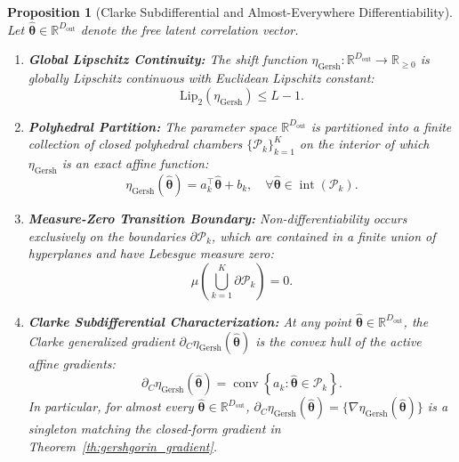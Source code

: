\documentclass[default,sn-mathphys,Numbered]{sn-jnl}
\theoremstyle{thmstyleone}
\newtheorem{proposition}[theorem]{Proposition}
\theoremstyle{thmstylethree}
\theoremstyle{thmstyletwo}
\newcommand{\outp}{\text{out}}
\begin{document}
\begin{appendices}
\begin{proposition}[Clarke Subdifferential and Almost-Everywhere Differentiability]
\label{prop:clarke_subdiff}
Let $\hat{\bm{\theta}} \in \mathbb{R}^{D_{\outp}}$ denote the free latent correlation vector.
\begin{enumerate}
    \item[(a)] \textbf{Global Lipschitz Continuity:} The shift function $\eta_{\mathrm{Gersh}} : \mathbb{R}^{D_{\outp}} \to \mathbb{R}_{\ge 0}$ is globally Lipschitz continuous with Euclidean Lipschitz constant:
    \begin{equation}
    \label{eq:lipschitz_bound}
    \mathrm{Lip}_2(\eta_{\mathrm{Gersh}}) \le L - 1.
    \end{equation}
    \item[(b)] \textbf{Polyhedral Partition:} The parameter space $\mathbb{R}^{D_{\outp}}$ is partitioned into a finite collection of closed polyhedral chambers $\{\mathcal{P}_k\}_{k=1}^K$ on the interior of which $\eta_{\mathrm{Gersh}}$ is an exact affine function:
    \begin{equation}
    \eta_{\mathrm{Gersh}}(\hat{\bm{\theta}}) = a_k^\top \hat{\bm{\theta}} + b_k, \quad \forall \hat{\bm{\theta}} \in \operatorname{int}(\mathcal{P}_k).
    \end{equation}
    \item[(c)] \textbf{Measure-Zero Transition Boundary:} Non-differentiability occurs exclusively on the boundaries $\partial \mathcal{P}_k$, which are contained in a finite union of hyperplanes and have Lebesgue measure zero:
    \begin{equation}
    \mu\left( \bigcup_{k=1}^K \partial \mathcal{P}_k \right) = 0.
    \end{equation}
    \item[(d)] \textbf{Clarke Subdifferential Characterization:} At any point $\hat{\bm{\theta}} \in \mathbb{R}^{D_{\outp}}$, the Clarke generalized gradient $\partial_C \eta_{\mathrm{Gersh}}(\hat{\bm{\theta}})$ is the convex hull of the active affine gradients:
    \begin{equation}
    \partial_C \eta_{\mathrm{Gersh}}(\hat{\bm{\theta}}) = \operatorname{conv}\left\{ a_k : \hat{\bm{\theta}} \in \mathcal{P}_k \right\}.
    \end{equation}
    In particular, for almost every $\hat{\bm{\theta}} \in \mathbb{R}^{D_{\outp}}$, $\partial_C \eta_{\mathrm{Gersh}}(\hat{\bm{\theta}}) = \{ \nabla \eta_{\mathrm{Gersh}}(\hat{\bm{\theta}}) \}$ is a singleton matching the closed-form gradient in Theorem~\ref{th:gershgorin_gradient}.
\end{enumerate}
\end{proposition}


\end{appendices}
\end{document}
